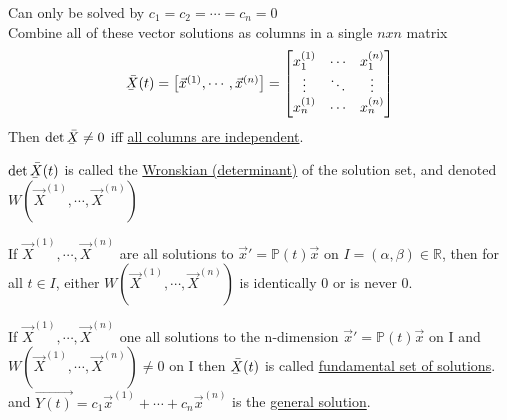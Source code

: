 \begin{enumerate}[label=\protect\circled{\arabic*}]
\begin{equation*}
	\end{equation*}
	Can only be solved by $c_1 = c_2 = \cdots = c_n = 0$\\
	Combine all of these vector solutions as columns in a single $nxn$ matrix
	\begin{equation*}
		\Xlines(t) = 
		\begin{bmatrix}
			\vec{x}^{(1)}, \cdots, \vec{x}^{(n)}
		\end{bmatrix} = 
		\begin{bmatrix}
			x_1^{(1)} & \cdots & x_1^{(n)}\\
			\vdots & \ddots & \vdots\\
			x_n^{(1)} & \cdots & x_n^{(n)}
		\end{bmatrix}
	\end{equation*}
	Then $\det \Xlines \neq 0$ iff \underline{all columns are independent}.
\end{enumerate}
\begin{definition}
	$\det \Xlines(t)$ is called the \underline{Wronskian (determinant)} of the solution set, and denoted $W(\vec{X}^{(1)}, \cdots, \vec{X}^{(n)})$
\end{definition}
\begin{theorem}
	If $\vec{X}^{(1)}, \cdots, \vec{X}^{(n)}$ are all solutions to $\vec{x}' = \mathbb{P}(t)\vec{x}$ on $I = (\alpha, \beta) \in \mathbb{R}$, then for all $t \in I$, either $W(\vec{X}^{(1)}, \cdots, \vec{X}^{(n)})$ is identically 0 or is never 0.
\end{theorem}
\begin{definition}
	If $\vec{X}^{(1)}, \cdots, \vec{X}^{(n)}$ one all solutions to the n-dimension $\vec{x}' = \mathbb{P}(t)\vec{x}$ on I and $W(\vec{X}^{(1)}, \cdots, \vec{X}^{(n)}) \neq 0$ on I then  $\Xlines(t)$ is called \underline{fundamental set of solutions}. and  $\vec{Y(t)} = c_1\vec{x}^{(1)} + \cdots + c_n\vec{x}^{(n)}$ is the \underline{general solution}.
\end{definition}
